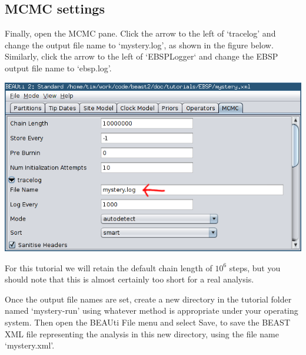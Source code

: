 \documentclass[a4paper,11pt]{article}
\begin{document}
%
%
%
%


\subsection{MCMC settings}

Finally, open the \textsc{MCMC} pane. Click the arrow to the left of `tracelog'
and change the output file name to `mystery.log', as shown in the figure below.
Similarly, click the arrow to the left of `EBSPLogger` and change the EBSP
output file name to `ebsp.log'.

    \includegraphics[width=\textwidth]{figures/mcmc_panel.png}

For this tutorial we will retain the default chain length of $10^6$ steps, but
you should note that this is almost certainly too short for a real analysis.


Once the output file names are set, create a new directory in the tutorial
folder named `mystery-run' using whatever method is appropriate under your
operating system.  Then open the BEAUti File menu and select Save, to save the
BEAST XML file representing the analysis in this new directory, using the file
name `mystery.xml'.
\end{document}

